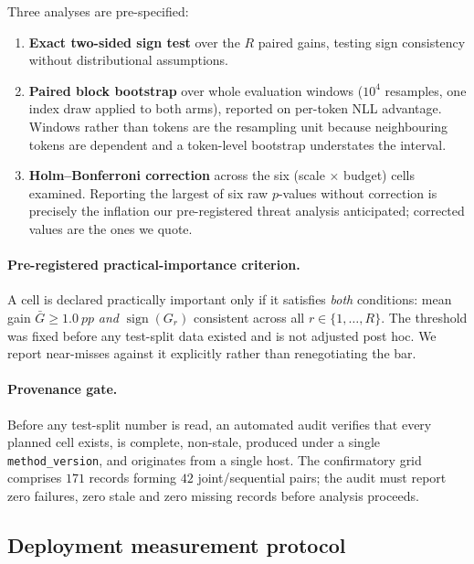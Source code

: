 Three analyses are pre-specified:

\begin{enumerate}
  \item \textbf{Exact two-sided sign test} over the $R$ paired gains, testing sign
        consistency without distributional assumptions.
  \item \textbf{Paired block bootstrap} over whole evaluation windows ($10^4$ resamples, one
        index draw applied to both arms), reported on per-token NLL advantage. Windows rather
        than tokens are the resampling unit because neighbouring tokens are dependent and a
        token-level bootstrap understates the interval.
  \item \textbf{Holm--Bonferroni correction} across the six (scale $\times$ budget) cells
        examined. Reporting the largest of six raw $p$-values without correction is precisely
        the inflation our pre-registered threat analysis anticipated; corrected values are the
        ones we quote.
\end{enumerate}

\paragraph{Pre-registered practical-importance criterion.} A cell is declared practically
important only if it satisfies \emph{both} conditions: mean gain $\bar{G} \geq
\SI{1.0}{pp}$ \emph{and} $\operatorname{sign}(G_r)$ consistent across all $r \in
\{1,\dots,R\}$. The threshold was fixed before any test-split data existed and is not
adjusted post hoc. We report near-misses against it explicitly rather than renegotiating the
bar.

\paragraph{Provenance gate.} Before any test-split number is read, an automated audit
verifies that every planned cell exists, is complete, non-stale, produced under a single
\texttt{method\_version}, and originates from a single host. The confirmatory grid comprises
$171$ records forming $42$ joint/sequential pairs; the audit must report zero failures,
zero stale and zero missing records before analysis proceeds.

\subsection{Deployment measurement protocol}
\label{subsec:deployment}


